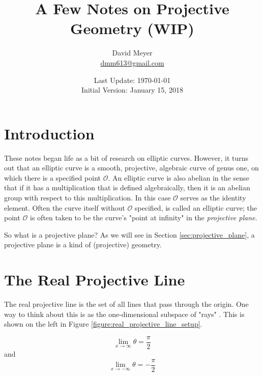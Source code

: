 \documentclass{article}
\title{A Few Notes on Projective Geometry (WIP)}
\author{David Meyer \\ \href{mailto:dmm613@gmail.com}
                            {dmm613@gmail.com}}
\date{Last Update: \today \\
	 {\vspace{1.00mm} \small Initial Version: January 15, 2018}}
\theoremstyle{definition}
\begin{document}
\maketitle

\section{Introduction}
These notes began life as a bit of research on elliptic curves. However, it turns out that an elliptic curve is a smooth, projective, algebraic curve of genus one, on which there is a specified point $\mathcal{O}$. An elliptic curve is also abelian in the sense that if it has a multiplication that is defined algebraically, then it is an abelian group with respect to 
this multiplication. In this case $\mathcal{O}$ serves as the identity element. Often the curve itself without $\mathcal{O}$ specified, is called an elliptic curve; the point $\mathcal{O}$ is often taken to be the curve's "point at infinity" in the \emph{projective plane}. 

\bigskip
\noindent
So what is a projective plane? As we will see in Section \ref{sec:projective_plane}, a projective plane is a kind of (projective) geometry. 

\section{The Real Projective Line}
\label{section:real_projective_line}
The real projective line is the set of all lines that pass
through the origin. One way to think about this is as the
one-dimensional subspace of "rays" 
\cite{youtube:vector_spaces_and_quantum_mechanics,wolfram:ray}. 
This is shown on the left in Figure
\ref{figure:real_projective_line_setup}.

\bigskip
\noindent
{}

\begin{equation*}
   \lim\limits_{x \to \infty} \theta = \frac{\pi}{2} 
\end{equation*}
\noindent
and
\begin{equation*}
   \lim\limits_{x \to -\infty} \theta = -\frac{\pi}{2} 
\end{equation*}
\end{document}
